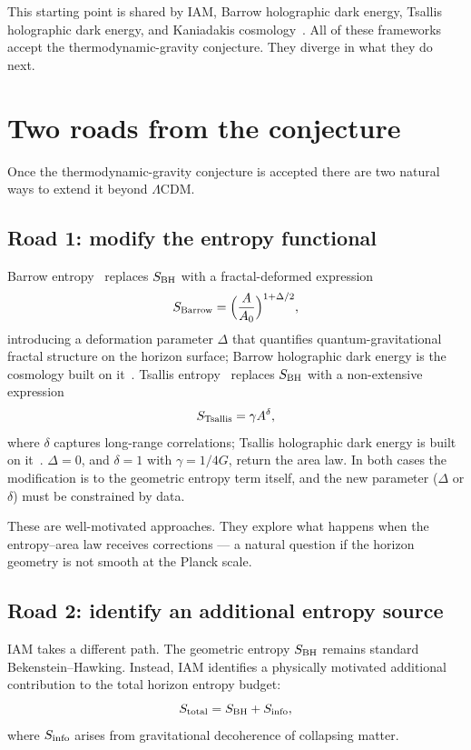 This starting point is shared by IAM, Barrow holographic dark energy, Tsallis holographic dark energy, and Kaniadakis cosmology~\cite{Lymperis2021}. All of
these frameworks accept the thermodynamic-gravity conjecture. They diverge in what they do next.

\section{Two roads from the conjecture}\label{sec:eg_roads}
Once the thermodynamic-gravity conjecture is accepted there are two natural ways to extend it beyond $\Lambda$CDM.

\subsection{Road 1: modify the entropy functional}
Barrow entropy~\cite{Barrow2020} replaces $S_{\rm BH}$ with a fractal-deformed expression
\begin{equation}S_{\rm Barrow}=\Big(\frac{A}{A_0}\Big)^{1+\Delta/2},\label{eq:eg_barrow}\end{equation}
introducing a deformation parameter $\Delta$ that quantifies quantum-gravitational fractal structure on the horizon surface; Barrow holographic dark energy
is the cosmology built on it~\cite{Saridakis2020barrow}. Tsallis entropy~\cite{TsallisCirto2013} replaces $S_{\rm BH}$ with a non-extensive expression
\begin{equation}S_{\rm Tsallis}=\gamma A^\delta,\label{eq:eg_tsallis}\end{equation}
where $\delta$ captures long-range correlations; Tsallis holographic dark energy is built on it~\cite{Saridakis2018tsallis}. $\Delta=0$, and $\delta=1$
with $\gamma=1/4G$, return the area law. In both cases the modification is to the geometric entropy term itself, and the new parameter ($\Delta$ or
$\delta$) must be constrained by data. \conjecture{}

These are well-motivated approaches. They explore what happens when the entropy--area law receives corrections --- a natural question if the horizon
geometry is not smooth at the Planck scale. \interp

\subsection{Road 2: identify an additional entropy source}
IAM takes a different path. The geometric entropy $S_{\rm BH}$ remains standard Bekenstein--Hawking. Instead, IAM identifies a physically motivated
additional contribution to the total horizon entropy budget:
\begin{equation}S_{\rm total}=S_{\rm BH}+S_{\rm info},\label{eq:eg_stotal}\end{equation}
where $S_{\rm info}$ arises from gravitational decoherence of collapsing matter. \conjecture

